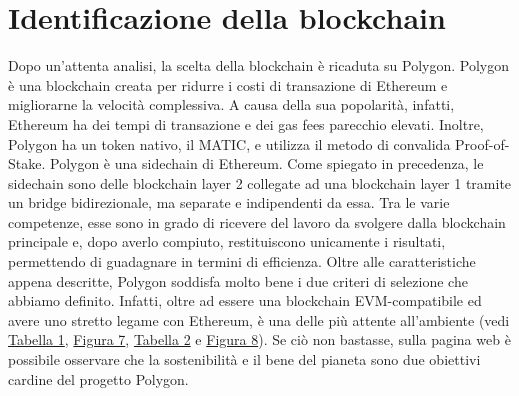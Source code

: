 \documentclass[12pt]{report}
\begin{document}
\section{Identificazione della blockchain}
\label{sec:polygon}
Dopo un'attenta analisi, la scelta della blockchain è ricaduta su Polygon.\newline
Polygon è una blockchain creata per ridurre i costi di transazione di Ethereum e migliorarne la velocità complessiva. A causa della sua popolarità, infatti, Ethereum ha dei tempi di transazione e dei gas fees parecchio elevati. Inoltre, Polygon ha un token nativo, il MATIC, e utilizza il metodo di convalida Proof-of-Stake.\newline
Polygon è una sidechain di Ethereum. Come spiegato in precedenza, le sidechain sono delle blockchain layer 2 collegate ad una blockchain layer 1 tramite un bridge bidirezionale, ma separate e indipendenti da essa. Tra le varie competenze, esse sono in grado di ricevere del lavoro da svolgere dalla blockchain principale e, dopo averlo compiuto, restituiscono unicamente i risultati, permettendo di guadagnare in termini di efficienza.\newline\newline
Oltre alle caratteristiche appena descritte, Polygon soddisfa molto bene i due criteri di selezione che abbiamo definito. Infatti, oltre ad essere una blockchain EVM-compatibile ed avere uno stretto legame con Ethereum, è una delle più attente all'ambiente (vedi \hyperref[tab:elettricità]{Tabella 1}, \hyperref[fig:elettricità]{Figura 7}, \hyperref[tab:CO2]{Tabella 2} e \hyperref[fig:CO2]{Figura 8}).\newline
Se ciò non bastasse, sulla pagina web \cite{Quattordici} è possibile osservare che la sostenibilità e il bene del pianeta sono due  obiettivi cardine del progetto Polygon.\newpage
\end{document}
